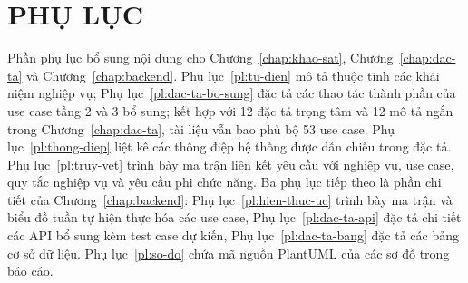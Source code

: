 \chapter*{PHỤ LỤC}

\setcounter{section}{0}
\renewcommand{\thesection}{\Alph{section}}
\renewcommand{\theHsection}{\Alph{section}}

Phần phụ lục bổ sung nội dung cho Chương~\ref{chap:khao-sat}, Chương~\ref{chap:dac-ta} và Chương~\ref{chap:backend}. Phụ lục~\ref{pl:tu-dien} mô tả thuộc tính các khái niệm nghiệp vụ; Phụ lục~\ref{pl:dac-ta-bo-sung} đặc tả các thao tác thành phần của use case tầng 2 và 3 bổ sung; kết hợp với 12 đặc tả trọng tâm và 12 mô tả ngắn trong Chương~\ref{chap:dac-ta}, tài liệu vẫn bao phủ bộ 53 use case. Phụ lục~\ref{pl:thong-diep} liệt kê các thông điệp hệ thống được dẫn chiếu trong đặc tả. Phụ lục~\ref{pl:truy-vet} trình bày ma trận liên kết yêu cầu với nghiệp vụ, use case, quy tắc nghiệp vụ và yêu cầu phi chức năng. Ba phụ lục tiếp theo là phần chi tiết của Chương~\ref{chap:backend}: Phụ lục~\ref{pl:hien-thuc-uc} trình bày ma trận và biểu đồ tuần tự hiện thực hóa các use case, Phụ lục~\ref{pl:dac-ta-api} đặc tả chi tiết các API bổ sung kèm test case dự kiến, Phụ lục~\ref{pl:dac-ta-bang} đặc tả các bảng cơ sở dữ liệu. Phụ lục~\ref{pl:so-do} chứa mã nguồn PlantUML của các sơ đồ trong báo cáo.





\begingroup
\usetalldiagrams

\endgroup



